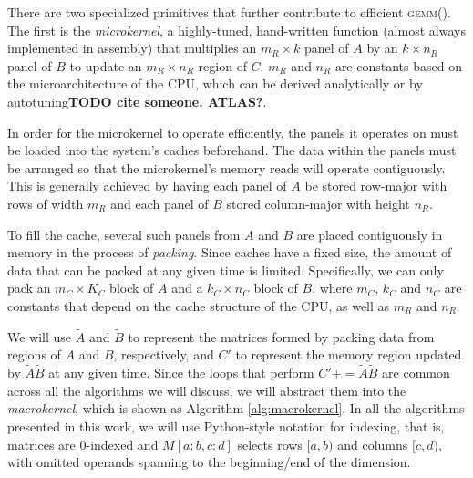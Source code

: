 \documentclass[12pt]{article}
\newcommand*{\TO}{\textbf{to}}
\newcommand*{\pluseq}{\mathrel{{+}{=}}}
\newcommand*{\gemm}{{\textsc{gemm()}}}
\begin{document}
There are two specialized primitives that further contribute to efficient \gemm{}.
The first is the \emph{microkernel}, a highly-tuned, hand-written function (almost always implemented in assembly) that multiplies an $m_R \times k$ panel of $A$ by an $k \times n_R$ panel of $B$ to update an $m_R \times n_R$ region of $C$.
$m_R$ and $n_R$ are constants based on the microarchitecture of the CPU, which can be derived analytically\cite{Low2016} or by autotuning\textbf{TODO cite someone. ATLAS?}.

In order for the microkernel to operate efficiently, the panels it operates on must be loaded into the system's caches beforehand.
The data within the panels must be arranged so that the microkernel's memory reads will operate contiguously.
This is generally achieved by having each panel of $A$ be stored row-major with rows of width $m_R$ and each panel of $B$ stored column-major with height $n_R$.

To fill the cache, several such panels from $A$ and $B$ are placed contiguously in memory in the process of \emph{packing}.
Since caches have a fixed size, the amount of data that can be packed at any given time is limited.
Specifically, we can only pack an $m_C \times K_C$ block of $A$ and a $k_C \times n_C$ block of $B$, where $m_C$, $k_C$ and $n_C$ are constants that depend on the cache structure of the CPU, as well as $m_R$ and $n_R$.

We will use $\tilde{A}$ and $\tilde{B}$ to represent the matrices formed by packing data from regions of $A$ and $B$, respectively, and $C'$ to represent the memory region updated by $\tilde{A}\tilde{B}$ at any given time.
Since the loops that perform $C' \pluseq \tilde{A}\tilde{B}$ are common across all the algorithms we will discuss, we will abstract them into the \emph{macrokernel}, which is shown as Algorithm \ref{alg:macrokernel}.
In all the algorithms presented in this work, we will use Python-style notation for indexing, that is, matrices are 0-indexed and  $M[a:b, c:d]$ selects rows $[a, b)$ and columns $[c, d)$, with omitted operands spanning to the beginning/end of the dimension.

\begin{algorithm}
  \caption{The macrokernel of a high-performance \gemm{} implementation}
  \label{alg:macrokernel}
  \begin{tikzpicture}
    
  \end{tikzpicture}
  \begin{algorithmic}
    \For{$j \gets 0, n_R, \ldots$ \TO{} $n_C$}
    \For{$i \gets 0, m_R, \ldots$ \TO{} $m_C$}
    \State{$C'[i:i + m_R, j:j + n_R] \pluseq \tilde{A}[i:i+m_R,:] \cdot \tilde{B}[:,j:j+n_R]$}
    \EndFor{}
    \EndFor{}
    \EndProcedure{}
  \end{algorithmic}
\end{algorithm}
\end{document}
